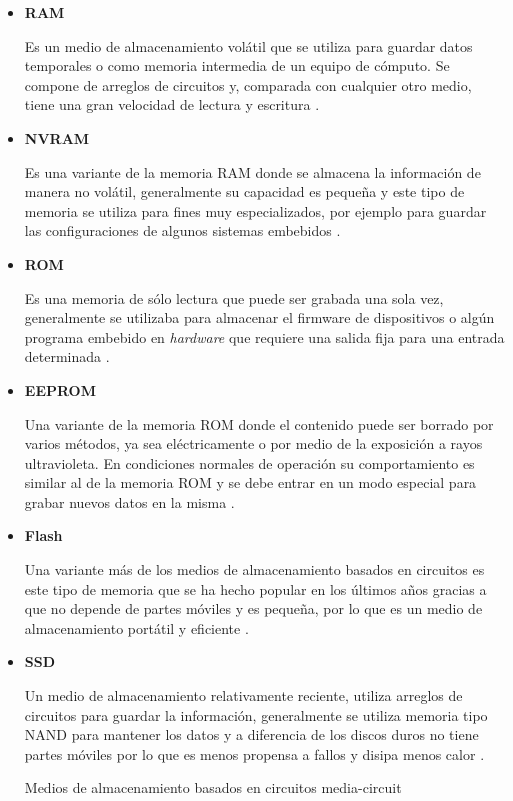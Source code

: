 \begin{itemize}

  \item \textbf{RAM}

Es un medio de almacenamiento vol\'{a}til que se utiliza para guardar datos temporales o como memoria intermedia de un equipo de c\'{o}mputo. Se compone de arreglos de circuitos y, comparada con cualquier otro medio, tiene una gran velocidad de lectura y escritura \cite{_rom_????}.

  \item \textbf{NVRAM}

Es una variante de la memoria \textsc{RAM} donde se almacena la informaci\'{o}n de manera no vol\'{a}til, generalmente su capacidad es peque\~{n}a y este tipo de memoria se utiliza para fines muy especializados, por ejemplo para guardar las configuraciones de algunos sistemas embebidos \cite{veenstra_random_1986}.

  \item \textbf{ROM}

Es una memoria de s\'{o}lo lectura que puede ser grabada una sola vez, generalmente se utilizaba para almacenar el firmware de dispositivos o alg\'{u}n programa embebido en \emph{\gls{hardware}} que requiere una salida fija para una entrada determinada \cite{_rom_????}.

  \item \textbf{EEPROM}

Una variante de la memoria \textsc{ROM} donde el contenido puede ser borrado por varios m\'{e}todos, ya sea el\'{e}ctricamente o por medio de la exposici\'{o}n a rayos ultravioleta. En condiciones normales de operaci\'{o}n su comportamiento es similar al de la memoria \textsc{ROM} y se debe entrar en un modo especial para grabar nuevos datos en la misma \cite{_rom_????-1}.

  \item \textbf{Flash}

Una variante m\'{a}s de los medios de almacenamiento basados en circuitos es este tipo de memoria que se ha hecho popular en los \'{u}ltimos a\~{n}os gracias a que no depende de partes m\'{o}viles y es peque\~{n}a, por lo que es un medio de almacenamiento port\'{a}til y eficiente \cite{_flashmemguide.pdf_????}.

  \item \textbf{SSD}

Un medio de almacenamiento relativamente reciente, utiliza arreglos de circuitos para guardar la informaci\'{o}n, generalmente se utiliza memoria tipo \textsc{NAND} para mantener los datos y a diferencia de los discos duros no tiene partes m\'{o}viles por lo que es menos propensa a fallos y disipa menos calor \cite{_ssd-faq-us.pdf_????}.

\diagramblock
{Medios de almacenamiento basados en circuitos}
{media-circuit}
{
 {
  
 }
}

\end{itemize}

